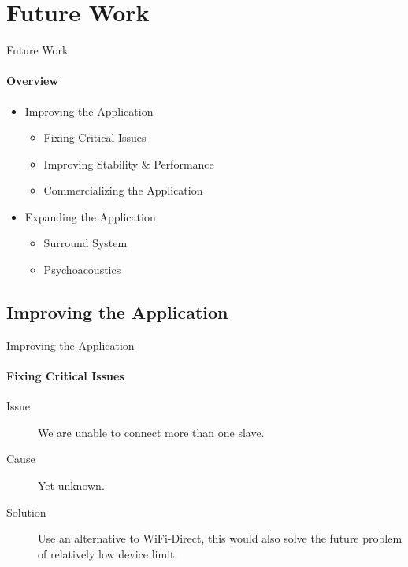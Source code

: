 \section{Future Work}
\author{Marc}
\begin{frame}{Future Work}
    \framesubtitle{Overview}
    \begin{itemize}
        \item{Improving the Application}
        \begin{itemize}
            \item Fixing Critical Issues
            \item Improving Stability \& Performance
            \item Commercializing the Application
        \end{itemize}
        \item{Expanding the Application}
        \begin{itemize}
            \item Surround System
            \item Psychoacoustics
        \end{itemize}
    \end{itemize}
\end{frame}

\subsection{Improving the Application}
\begin{frame}{Improving the Application}
    \framesubtitle{Fixing Critical Issues}
    \begin{description}
        \item [Issue] We are unable to connect more than one slave.
        \item [Cause] Yet unknown.
        \item [Solution] Use an alternative to WiFi-Direct, this would also solve the future problem of relatively low device limit. %
    \end{description}
\end{frame}

